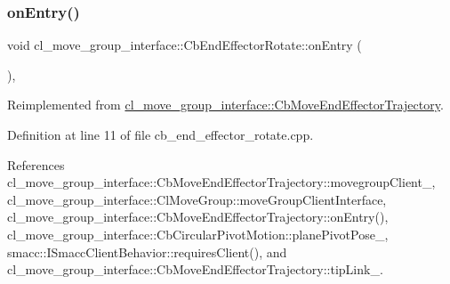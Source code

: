 \subsubsection{\texorpdfstring{on\+Entry()}{onEntry()}}
{\footnotesize\ttfamily void cl\+\_\+move\+\_\+group\+\_\+interface\+::\+Cb\+End\+Effector\+Rotate\+::on\+Entry (\begin{DoxyParamCaption}{ }\end{DoxyParamCaption})\hspace{0.3cm}{\ttfamily [override]}, {\ttfamily [virtual]}}



Reimplemented from \hyperlink{classcl__move__group__interface_1_1CbMoveEndEffectorTrajectory_aaedd074fd178c6390a4a3f1ccff23ad3}{cl\+\_\+move\+\_\+group\+\_\+interface\+::\+Cb\+Move\+End\+Effector\+Trajectory}.



Definition at line 11 of file cb\+\_\+end\+\_\+effector\+\_\+rotate.\+cpp.



References cl\+\_\+move\+\_\+group\+\_\+interface\+::\+Cb\+Move\+End\+Effector\+Trajectory\+::movegroup\+Client\+\_\+, cl\+\_\+move\+\_\+group\+\_\+interface\+::\+Cl\+Move\+Group\+::move\+Group\+Client\+Interface, cl\+\_\+move\+\_\+group\+\_\+interface\+::\+Cb\+Move\+End\+Effector\+Trajectory\+::on\+Entry(), cl\+\_\+move\+\_\+group\+\_\+interface\+::\+Cb\+Circular\+Pivot\+Motion\+::plane\+Pivot\+Pose\+\_\+, smacc\+::\+I\+Smacc\+Client\+Behavior\+::requires\+Client(), and cl\+\_\+move\+\_\+group\+\_\+interface\+::\+Cb\+Move\+End\+Effector\+Trajectory\+::tip\+Link\+\_\+.


